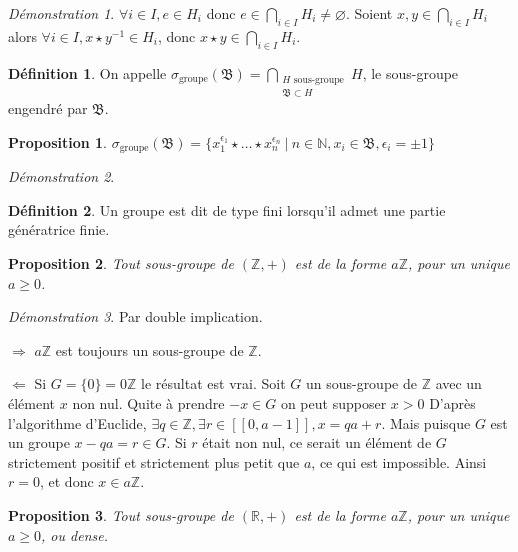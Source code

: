 \documentclass[a4paper, 11pt, french]{book}
\newenvironment{itemise}{\itemize}{\enditemize}
\let\colour=\color
\theoremstyle{plain} %
\newtheorem{proposition}{Proposition}
\theoremstyle{definition} %
\newtheorem{definition}{Définition}
\theoremstyle{remark} %
\newtheorem*{demonstration}{Démonstration}
\newcommand{\1}{\mathds{1}}
\newcommand\vide{\varnothing}
\newcommand{\inv}[1]{#1^{-1}}
\newcommand{\N}{\mathbb{N}}
\newcommand{\Z}{\mathbb{Z}}
\newcommand{\R}{\mathbb{R}}
\renewcommand{\frak}[1]{\mathfrak{#1}}
\renewcommand{\rm}[1]{\mathrm{#1}}
\newcommand\ens[2]{\{#1 \ |\ #2\}}
\newcommand\equivalence[3]{
	\begin{demonstration}
		#1
		\begin{itemise}
			\item[$\Longrightarrow$] #2
			\item[$\Longleftarrow$] #3
		\end{itemise}
	\end{demonstration}
}
\begin{document}
\begin{demonstration}
	$\forall i\in I, e\in H_i$ donc $e\in\bigcap_{i\in I}H_i\neq\vide$.
	Soient $x, y\in\bigcap_{i\in I}H_i$ alors $\forall i\in I, x\star\inv{y}\in H_i$, donc $x\star y\in\bigcap_{i\in I}H_i$.
\end{demonstration}

\begin{definition}
	On appelle $\sigma_\rm{groupe}(\frak{B})=\bigcap_{\substack{H\text{ sous-groupe}\\\frak{B}\subset H}}H$, le sous-groupe engendré par $\frak{B}$.
\end{definition}

\begin{proposition}
	$\sigma_\rm{groupe}(\frak{B})=\ens{x_1^{\epsilon_1}\star\dots\star x_n^{\epsilon_n}}{n\in\N, x_i\in\frak{B}, \epsilon_i=\pm1}$
\end{proposition}

\begin{demonstration}
	\colour{red}{À démontrer}
\end{demonstration}

\begin{definition}
	Un groupe est dit de type fini lorsqu'il admet une partie génératrice finie.
\end{definition}

\begin{proposition}
	Tout sous-groupe de $(\Z, +)$ est de la forme $a\Z$, pour un unique $a\geqslant0$.
\end{proposition}

\equivalence{Par double implication.}{
	$a\Z$ est toujours un sous-groupe de $\Z$.
}{
	Si $G=\{0\}=0\Z$ le résultat est vrai.
	Soit $G$ un sous-groupe de $\Z$ avec un élément $x$ non nul.
	Quite à prendre $-x\in G$ on peut supposer $x>0$
	D'après l'algorithme d'Euclide, $\exists q\in\Z, \exists r\in[\![0, a-1]\!], x = qa + r$.
	Mais puisque $G$ est un groupe $x-qa=r\in G$.
	Si $r$ était non nul, ce serait un élément de $G$ strictement positif et strictement plus petit que $a$, ce qui est impossible.
	Ainsi $r=0$, et donc $x\in a\Z$.
}

\begin{proposition}
	Tout sous-groupe de $(\R, +)$ est de la forme $a\Z$, pour un unique $a\geqslant0$, ou dense.
\end{proposition}
\end{document}
